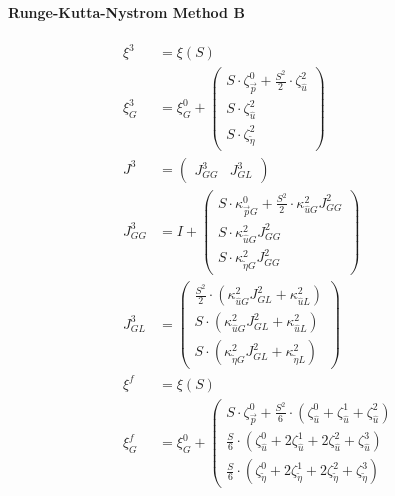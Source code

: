 \documentclass[review]{elsarticle}
\begin{document}
\paragraph{Runge-Kutta-Nystrom Method B}
\begin{equation} \begin{alignedat}{-1}
    \xi^{3}&=\xi\left(S\right) \\
    \xi_{G}^{3}&=\xi_{G}^{0}+\left(\begin{array}{l}
        S\cdot\zeta_{\vec{p}}^{0}+\frac{S^{2}}{2}\cdot\zeta_{\hat{u}}^{2}\\
        S\cdot\zeta_{\hat{u}}^{2}\\
        S\cdot\zeta_{\tilde{\eta}}^{2}
    \end{array}\right) \\
    J^{3}&=\left(\begin{array}{cc}
        J_{GG}^{3} & J_{GL}^{3}
    \end{array}\right) \\
    J_{GG}^{3}&=I+\left(\begin{array}{l}
        S\cdot\kappa_{\vec{p}G}^{0}+\frac{S^{2}}{2}\cdot\kappa_{\hat{u}G}^{2}J_{GG}^{2}\\
        S\cdot\kappa_{\hat{u}G}^{2}J_{GG}^{2}\\
        S\cdot\kappa_{\tilde{\eta}G}^{2}J_{GG}^{2}
    \end{array}\right) \\
    J_{GL}^{3}&=\left(\begin{array}{l}
        \frac{S^{2}}{2}\cdot\left(\kappa_{\hat{u}G}^{2}J_{GL}^{2}+\kappa_{\hat{u}L}^{2}\right)\\
        S\cdot\left(\kappa_{\hat{u}G}^{2}J_{GL}^{2}+\kappa_{\hat{u}L}^{2}\right)\\
        S\cdot\left(\kappa_{\tilde{\eta}G}^{2}J_{GL}^{2}+\kappa_{\tilde{\eta}L}^{2}\right)
    \end{array}\right) \\
    \xi^{f}&=\xi\left(S\right) \\
    \xi_{G}^{f}&=\xi_{G}^{0}+\left(\begin{array}{l}
        S\cdot\zeta_{\vec{p}}^{0}+\frac{S^{2}}{6}\cdot\left(\zeta_{\hat{u}}^{0}+\zeta_{\hat{u}}^{1}+\zeta_{\hat{u}}^{2}\right)\\
        \frac{S}{6}\cdot\left(\zeta_{\hat{u}}^{0}+2\zeta_{\hat{u}}^{1}+2\zeta_{\hat{u}}^{2}+\zeta_{\hat{u}}^{3}\right)\\
        \frac{S}{6}\cdot\left(\zeta_{\tilde{\eta}}^{0}+2\zeta_{\tilde{\eta}}^{1}+2\zeta_{\tilde{\eta}}^{2}+\zeta_{\tilde{\eta}}^{3}\right)

\end{array}
\end{alignedat}
\end{equation}
\end{document}
